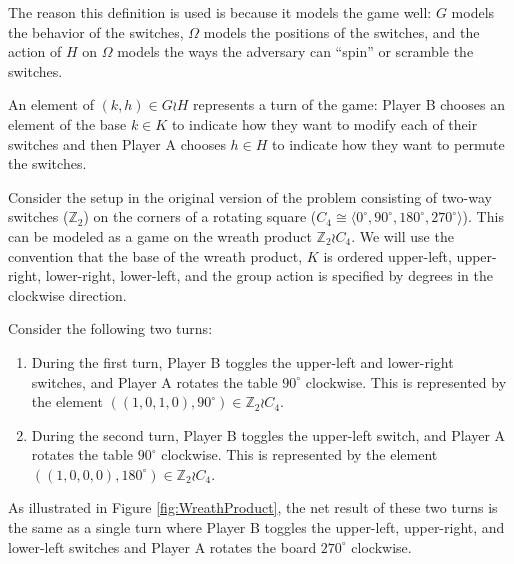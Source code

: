 The reason this definition is used is because it models the game well:
$G$ models the behavior of the switches, $\Omega$ models the positions of the
switches, and the action of $H$ on $\Omega$ models the ways the adversary can
``spin'' or scramble the switches.

An element of $(k, h) \in G \wr H$ represents a turn of the game:
Player B chooses an element of the base $k \in K$ to indicate
how they want to modify each of their switches
and then Player A chooses $h \in H$ to indicate how they want to permute the
switches.

\begin{example}
  Consider the setup in the original version of the problem consisting of
  two-way switches ($\mathbb Z_2$)
  on the corners of a rotating square
  ($C_4 \cong \langle 0^\circ, 90^\circ, 180^\circ, 270^\circ \rangle$).
  This can be modeled as a game on the wreath product $\mathbb Z_2 \wr C_4$.
  We will use the convention that the base of the wreath product, $K$ is
  ordered upper-left, upper-right, lower-right, lower-left, and the group
  action is specified by degrees in the clockwise direction.

  Consider the following two turns:
  \begin{enumerate}
    \item During the first turn,
    Player B toggles the upper-left and lower-right switches, and
    Player A rotates the table $90^\circ$ clockwise.
    This is represented by the element
    $((1,0,1,0), 90^\circ) \in \mathbb Z_2 \wr C_4$.
    \item During the second turn,
    Player B toggles the upper-left switch, and
    Player A rotates the table $90^\circ$ clockwise.
    This is represented by the element
    $((1,0,0,0), 180^\circ) \in \mathbb Z_2 \wr C_4$.
  \end{enumerate}
  As illustrated in Figure \ref{fig:WreathProduct},
  the net result of these two turns is the same as
  a single turn where Player B toggles the upper-left, upper-right, and lower-left
  switches and Player A rotates the board $270^\circ$ clockwise.

  \begin{figure}
    \center
\end{figure}
\end{example}
